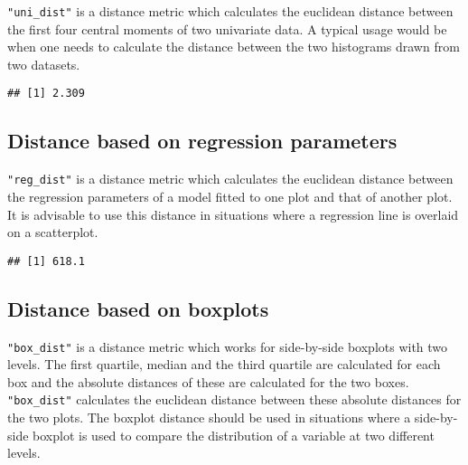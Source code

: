 \texttt{"uni\_dist"} is a distance metric which calculates the euclidean
distance between the first four central moments of two univariate data.
A typical usage would be when one needs to calculate the distance
between the two histograms drawn from two datasets.

\begin{Shaded}
\begin{Highlighting}[]
\NormalTok{(}\NormalTok{(}\NormalTok{), }\NormalTok{(}\NormalTok{, }\NormalTok{))}
\end{Highlighting}
\end{Shaded}

\begin{verbatim}
## [1] 2.309
\end{verbatim}

\subsection{Distance based on regression
parameters}\label{distance-based-on-regression-parameters}

\texttt{"reg\_dist"} is a distance metric which calculates the euclidean
distance between the regression parameters of a model fitted to one plot
and that of another plot. It is advisable to use this distance in
situations where a regression line is overlaid on a scatterplot.

\begin{Shaded}
\begin{Highlighting}[]
\NormalTok{(}\NormalTok{(}
\end{Highlighting}
\end{Shaded}

\begin{verbatim}
## [1] 618.1
\end{verbatim}

\subsection{Distance based on
boxplots}\label{distance-based-on-boxplots}

\texttt{"box\_dist"} is a distance metric which works for side-by-side
boxplots with two levels. The first quartile, median and the third
quartile are calculated for each box and the absolute distances of these
are calculated for the two boxes. \texttt{"box\_dist"} calculates the
euclidean distance between these absolute distances for the two plots.
The boxplot distance should be used in situations where a side-by-side
boxplot is used to compare the distribution of a variable at two
different levels.

